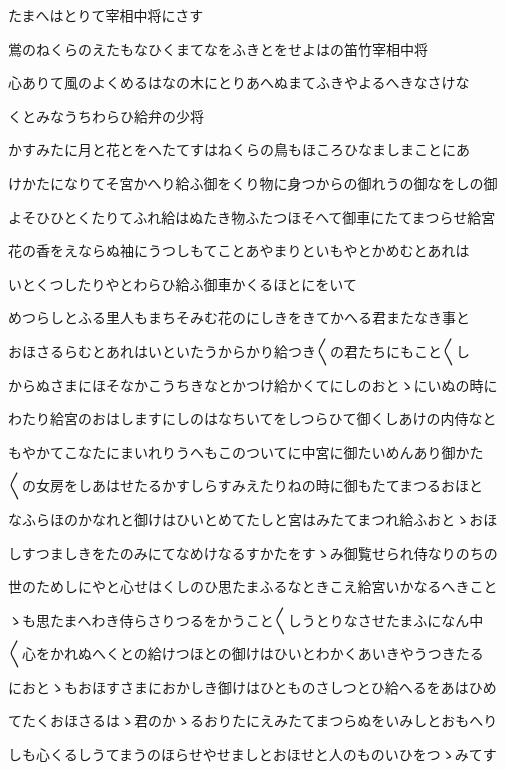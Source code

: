 \documentclass[a4paper,11pt,landscape]{ltjtarticle}
\begin{document}
たまへはとりて宰相中将にさす
\par\medskip
鴬のねくらのえたもなひくまてなをふきとをせよはの笛竹宰相中将
\par\medskip
心ありて風のよくめるはなの木にとりあへぬまてふきやよるへきなさけな
\par\medskip
くとみなうちわらひ給弁の少将
\par\medskip
かすみたに月と花とをへたてすはねくらの鳥もほころひなましまことにあ
\par\medskip
けかたになりてそ宮かへり給ふ御をくり物に身つからの御れうの御なをしの御
\par\medskip
よそひひとくたりてふれ給はぬたき物ふたつほそへて御車にたてまつらせ給宮
\par\medskip
花の香をえならぬ袖にうつしもてことあやまりといもやとかめむとあれは
\par\medskip
いとくつしたりやとわらひ給ふ御車かくるほとにをいて
\par\medskip
めつらしとふる里人もまちそみむ花のにしきをきてかへる君またなき事と
\par\medskip
おほさるらむとあれはいといたうからかり給つき〱の君たちにもこと〱し
\par\medskip
からぬさまにほそなかこうちきなとかつけ給かくてにしのおとゝにいぬの時に
\par\medskip
わたり給宮のおはしますにしのはなちいてをしつらひて御くしあけの内侍なと
\par\medskip
もやかてこなたにまいれりうへもこのついてに中宮に御たいめんあり御かた
\par\medskip
〱の女房をしあはせたるかすしらすみえたりねの時に御もたてまつるおほと
\par\medskip
なふらほのかなれと御けはひいとめてたしと宮はみたてまつれ給ふおとゝおほ
\par\medskip
しすつましきをたのみにてなめけなるすかたをすゝみ御覧せられ侍なりのちの
\par\medskip
世のためしにやと心せはくしのひ思たまふるなときこえ給宮いかなるへきこと
\par\medskip
ゝも思たまへわき侍らさりつるをかうこと〱しうとりなさせたまふになん中
\par\medskip
〱心をかれぬへくとの給けつほとの御けはひいとわかくあいきやうつきたる
\par\medskip
におとゝもおほすさまにおかしき御けはひとものさしつとひ給へるをあはひめ
\par\medskip
てたくおほさるはゝ君のかゝるおりたにえみたてまつらぬをいみしとおもへり
\par\medskip
しも心くるしうてまうのほらせやせましとおほせと人のものいひをつゝみてす
\end{document}

